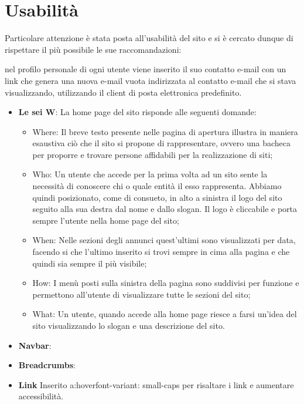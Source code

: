 \documentclass[12pt]{article}
\begin{document}
		
		
\section{Usabilità}
Particolare attenzione è stata posta all’usabilità del sito e si è cercato dunque di rispettare il più possibile le sue raccomandazioni:

nel profilo personale di ogni utente viene inserito il suo contatto e-mail con un link che genera una nuova e-mail vuota indirizzata al contatto e-mail che si stava visualizzando, utilizzando il client di posta elettronica predefinito.

\begin{itemize}
\item \textbf{Le sei W}: La home page del sito risponde alle seguenti domande:

\begin{itemize}
\item Where: Il breve testo presente nelle pagina di apertura illustra in maniera esaustiva ciò che il sito si propone di rappresentare, ovvero una bacheca per proporre e trovare persone affidabili per la realizzazione di siti;
\item Who: Un utente che accede per la prima volta ad un sito sente la necessità di conoscere chi o quale entità il esso rappresenta. Abbiamo quindi posizionato, come di consueto, in alto a sinistra il logo del sito seguito alla sua destra dal nome e dallo slogan. Il logo è cliccabile e porta sempre l'utente nella home page del sito;
\item When: Nelle sezioni degli annunci quest'ultimi sono visualizzati per data, facendo si che l'ultimo inserito si trovi sempre in cima alla pagina e che quindi sia sempre il più visibile;
\item How: I menù posti sulla sinistra della pagina sono suddivisi per funzione e permettono all'utente di visualizzare tutte le sezioni del sito;
\item What: Un utente, quando accede alla home page riesce a farsi un’idea del sito visualizzando lo slogan e una descrizione del sito.
\end{itemize}

\item \textbf{Navbar}:

\item \textbf{Breadcrumbs}:

\item \textbf{Link}
Inserito a:hover{font-variant: small-caps} per risaltare i link e aumentare accessibilità.


\end{itemize}
\end{document}
